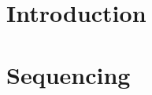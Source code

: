 \documentclass[12pt]{report}
\begin{document}

\tableofcontents

\chapter{Introduction}

\chapter{Sequencing}
\end{document}
